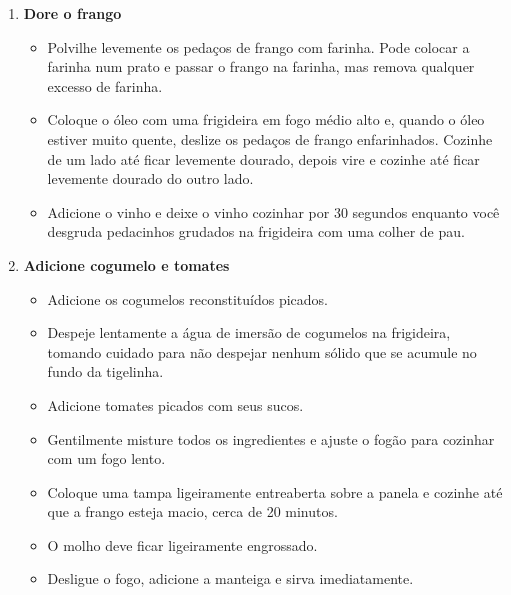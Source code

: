 \documentclass [11pt, letterpaper] {article}
\begin{document}
\begin {description}
\begin {enumerate}
\item {\bf Dore o frango}
\begin {itemize}
\item Polvilhe levemente os pedaços de frango com farinha. Pode colocar a farinha num prato e passar o frango na farinha, mas remova qualquer excesso de farinha.
\item Coloque o óleo com uma frigideira em fogo médio alto e, quando o óleo estiver muito quente, deslize os pedaços de frango enfarinhados. Cozinhe de um lado até ficar levemente dourado, depois vire e cozinhe at\'e ficar levemente dourado do outro lado.
\item Adicione o vinho e deixe o vinho cozinhar por 30 segundos enquanto você desgruda pedacinhos grudados na frigideira com uma colher de pau. 
\end {itemize}

\item {\bf Adicione cogumelo e tomates}
\begin {itemize}
\item Adicione os cogumelos reconstituídos picados.
\item Despeje lentamente a água de imersão de cogumelos na frigideira, tomando cuidado para não despejar nenhum sólido que se acumule no fundo da tigelinha.
\item Adicione tomates picados com seus sucos.
\item Gentilmente misture todos os ingredientes e ajuste o fog\~ao para cozinhar com um fogo lento.
\item Coloque uma tampa ligeiramente entreaberta sobre a panela e cozinhe até que a frango esteja macio, cerca de 20 minutos.
\item O molho deve ficar ligeiramente engrossado.
\item Desligue o fogo, adicione a manteiga e sirva imediatamente.
\end {itemize}

\end {enumerate}
\end {description}
\end{document}
